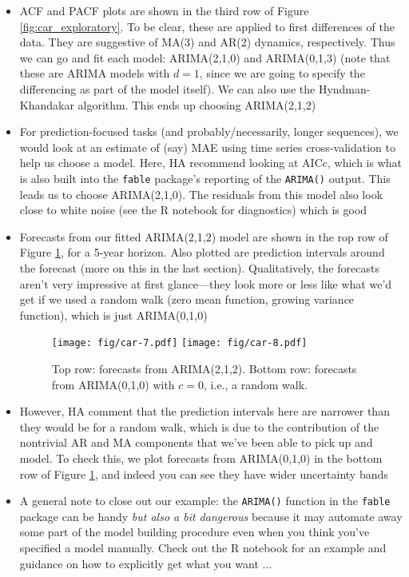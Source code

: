 \documentclass{article}
\begin{document}
\begin{itemize}
\item ACF and PACF plots are shown in the third row of Figure
  \ref{fig:car_exploratory}. To be clear, these are applied to first differences
  of the data. They are suggestive of MA(3) and AR(2) dynamics,
  respectively. Thus we can go and fit each model: ARIMA(2,1,0) and ARIMA(0,1,3)
  (note that these are ARIMA models with $d=1$, since we are going to specify
  the differencing as part of the model itself). We can also use the
  Hyndman-Khandakar algorithm. This ends up choosing ARIMA(2,1,2)   

\item For prediction-focused tasks (and probably/necessarily, longer sequences),
  we would look at an estimate of (say) MAE using time series cross-validation
  to help us choose a model. Here, HA recommend looking at AICc, which is what
  is also built into the \verb|fable| package's reporting of the \verb|ARIMA()| 
  output. This leads us to choose ARIMA(2,1,0). The residuals from this model
  also look close to white noise (see the R notebook for diagnostics) which is
  good  

\item Forecasts from our fitted ARIMA(2,1,2) model are shown in the rop row of
  Figure \ref{fig:car_forecast}, for a 5-year horizon. Also plotted are
  prediction intervals around the forecast (more on this in the last 
  section). Qualitatively, the forecasts aren't very impressive at first
  glance---they look more or less like what we'd get if we used a random walk
  (zero mean function, growing variance function), which is just ARIMA(0,1,0)   

\begin{figure}[p]
\centering
\texttt{[image: fig/car-7.pdf]}
\texttt{[image: fig/car-8.pdf]}
\caption{Top row: forecasts from ARIMA(2,1,2). Bottom row: forecasts from
  ARIMA(0,1,0) with $c=0$, i.e., a random walk.}
\label{fig:car_forecast}
\end{figure}

\item However, HA comment that the prediction intervals here are narrower than
  they would be for a random walk, which is due to the contribution of the
  nontrivial AR and MA components that we've been able to pick up and model. To
  check this, we plot forecasts from ARIMA(0,1,0) in the bottom row of Figure
  \ref{fig:car_forecast}, and indeed you can see they have wider uncertainty 
  bands 

\item A general note to close out our example: the \verb|ARIMA()| function in
  the \verb|fable| package can be handy \emph{but also a bit dangerous} because
  it may automate away some part of the model building procedure even when you 
  think you've specified a model manually. Check out the R notebook for an
  example and guidance on how to explicitly get what you want ... 
\end{itemize}
\end{document}
